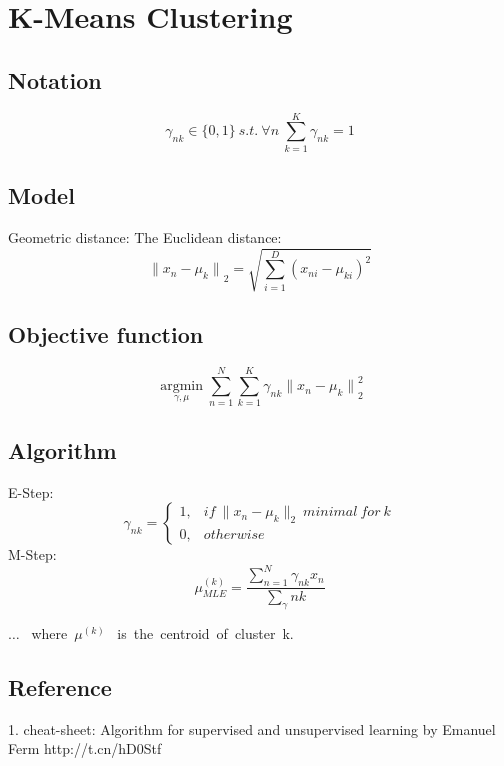 \chapter{K-Means Clustering}

\section{Notation}

\begin{equation}
\gamma_{nk} \in \{0,1\} \ s.t.\ \forall n\ \sum_{k=1}^K \gamma_{nk}=1
\end{equation}


\section{Model}
Geometric distance: The Euclidean distance:
\begin{equation}
{\|{x_n-\mu_k}\|}_2=\sqrt{\sum_{i=1}^D (x_{ni}-\mu_{ki})^2}
\end{equation}

\section{Objective function}
\begin{equation}
\underset{\gamma,\mu}{\operatorname{argmin}} \sum_{n=1}^N {\sum_{k=1}^K}\gamma_{nk}{{\|{x_n-\mu_k}\|}_2^2}
\end{equation}

\section{Algorithm}
E-Step:
\begin{equation}
\gamma_{nk}=\begin{cases} 1,& if\  \|x_n-\mu_k\|_2 \ minimal\ for  \ k \\ 0, &otherwise \end{cases}
\end{equation}
M-Step:
\begin{equation}
\mu_{MLE}^{(k)}= \frac{\sum_{n=1}^N{\gamma_{nk}x_n}}{\sum_\gamma {nk}}
\end{equation}

$\dotsc$ \ where\ $\mu^{(k)}$ \ is\ the\ centroid\ of\ cluster\ k.

\section{Reference}
1. cheat-sheet: Algorithm for supervised and unsupervised learning by Emanuel Ferm http://t.cn/hD0Stf
